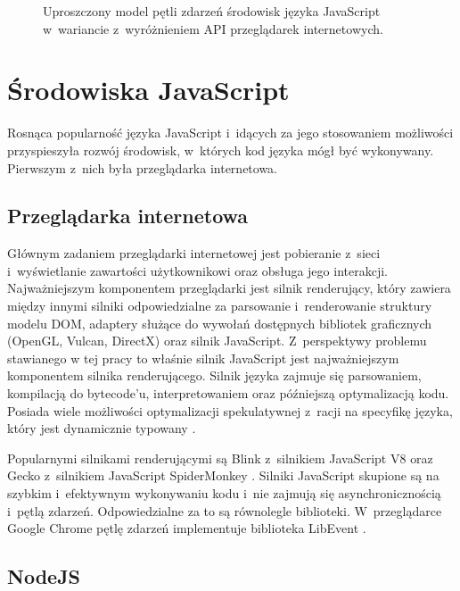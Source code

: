 \begin{figure}
    \centering
    
    \caption{Uproszczony model pętli zdarzeń środowisk języka JavaScript w~wariancie z~wyróżnieniem API przeglądarek internetowych.}
    \label{fig:event-loop}
\end{figure}

\section{Środowiska JavaScript}
\label{sec:env-modules}

Rosnąca popularność języka JavaScript i~idących za jego stosowaniem możliwości przyspieszyła rozwój środowisk, w~których kod języka mógł być wykonywany. Pierwszym z~nich była przeglądarka internetowa. 

\subsection{Przeglądarka internetowa}

Głównym zadaniem przeglądarki internetowej jest pobieranie z~sieci i~wyświetlanie zawartości użytkownikowi oraz obsługa jego interakcji. Najważniejszym komponentem przeglądarki jest silnik renderujący, który zawiera między innymi silniki odpowiedzialne za parsowanie i~renderowanie struktury modelu DOM, adaptery służące do wywołań dostępnych bibliotek graficznych (OpenGL, Vulcan, DirectX) oraz silnik JavaScript. Z~perspektywy problemu stawianego w tej pracy to właśnie silnik JavaScript jest najważniejszym komponentem silnika renderującego. Silnik języka zajmuje się parsowaniem, kompilacją do bytecode'u, interpretowaniem oraz późniejszą optymalizacją kodu. Posiada wiele możliwości optymalizacji spekulatywnej z~racji na specyfikę języka, który jest dynamicznie typowany \cite{meurer_2017}.

Popularnymi silnikami renderującymi są Blink z~silnikiem JavaScript V8 \cite{V8} oraz Gecko z~silnikiem JavaScript SpiderMonkey \cite{spidermonkey}. Silniki JavaScript skupione są na szybkim i~efektywnym wykonywaniu kodu i~nie zajmują się asynchronicznością i~pętlą zdarzeń. Odpowiedzialne za to są równolegle biblioteki. W~przeglądarce Google Chrome pętlę zdarzeń implementuje biblioteka LibEvent \cite{libevent}.

\subsection{NodeJS}

